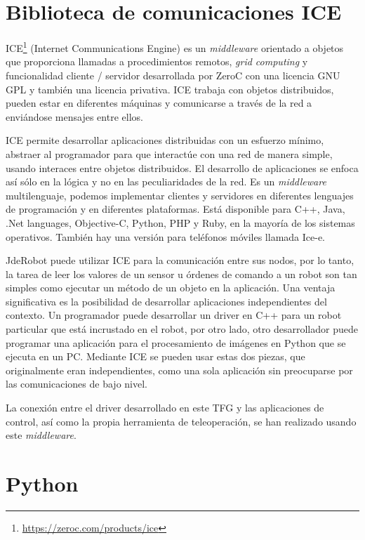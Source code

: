 \section{Biblioteca de comunicaciones ICE}
\label{sec:ICE}
ICE\footnote{\url{https://zeroc.com/products/ice}}\cite{ice} (Internet Communications Engine) es un \textit{middleware}  orientado a objetos que proporciona llamadas a procedimientos remotos, \textit{grid computing} y funcionalidad cliente / servidor desarrollada por ZeroC con una licencia GNU GPL y también una licencia privativa. ICE trabaja con objetos distribuidos, pueden estar en diferentes máquinas y comunicarse a través de la red a enviándose mensajes entre ellos. 

ICE permite desarrollar aplicaciones distribuidas con un esfuerzo mínimo, abstraer al programador para que interactúe con una red de manera simple, usando interaces entre objetos distribuidos. El desarrollo de aplicaciones se enfoca así sólo en la lógica y no en las peculiaridades de la red. Es un \textit{middleware} multilenguaje, podemos implementar clientes y servidores en diferentes lenguajes de programación y en diferentes plataformas. Está disponible para C++, Java, .Net languages, Objective-C, Python, PHP y Ruby, en la mayoría de los sistemas operativos. También hay una versión para teléfonos móviles llamada Ice-e. 

JdeRobot puede utilizar ICE para la comunicación entre sus nodos, por lo tanto, la tarea de leer
los valores de un sensor u órdenes de comando a un robot son tan simples como ejecutar un método de un objeto en la aplicación. Una ventaja significativa es la posibilidad de desarrollar aplicaciones independientes del contexto. Un programador puede desarrollar un driver en C++ para un robot particular que está incrustado en el robot, por otro lado, otro desarrollador puede programar una aplicación para el procesamiento de imágenes en Python que se ejecuta en un PC. Mediante ICE se pueden usar estas dos piezas, que originalmente eran independientes, como una sola aplicación sin preocuparse por las comunicaciones de bajo nivel.

La conexión entre el driver desarrollado en este TFG y las aplicaciones de control, así como la propia herramienta de teleoperación, se han realizado usando este \textit{middleware}.

\clearpage
\section{Python}
\label{sec:python}

